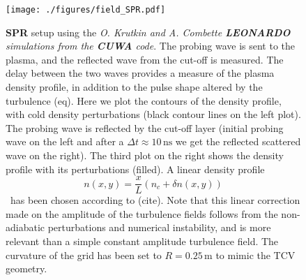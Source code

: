 \documentclass[11pt,a4paper,openany]{report}
\begin{document}
\begin{figure}[H]
    \centering
    \hspace*{-.17cm}\texttt{[image: ./figures/field\_SPR.pdf]}
    \caption{\textbf{SPR} setup using the \emph{O. Krutkin and A. Combette \textbf{LEONARDO} simulations from the \textbf{CUWA} code}. The probing wave is sent to the plasma, and the reflected wave from the cut-off is measured. The delay between the two waves provides a measure of the plasma density profile, in addition to the pulse shape altered by the turbulence (eq). Here we plot the contours of the density profile, with cold density perturbations (black contour lines on the left plot). The probing wave is reflected by the cut-off layer (initial probing wave on the left and after a $\Delta t \approx 10 \, \text{ns}$ we get the reflected scattered wave on the right). The third plot on the right shows the density profile with its perturbations (filled). A linear density profile
        \[ n(x,y) = \frac{x}{L} \left(n_c + \delta n(x,y)\right) \]\
        has been chosen according to (cite). Note that this linear correction made on the amplitude of the turbulence fields follows from the non-adiabatic perturbations \cite{San_diego} and numerical instability, and is more relevant than a simple constant amplitude turbulence field. The curvature of the grid has been set to \( R = 0.25 \, \text{m} \) to mimic the TCV geometry.}
    \label{}
\end{figure}
\end{document}
